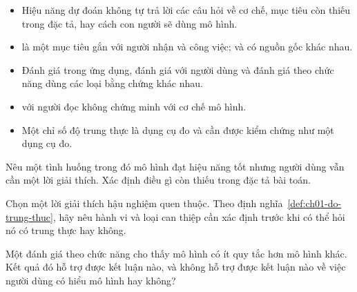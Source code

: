 \begin{tomtat}
\begin{itemize}
  \item Hiệu năng dự đoán không tự trả lời các câu hỏi về cơ chế, mục tiêu còn
  thiếu trong đặc tả, hay cách con người sẽ dùng mô hình.
  \item {} là một mục tiêu gắn với
  người nhận và công việc;  và  có nguồn gốc khác nhau.
  \item Đánh giá trong ứng dụng, đánh giá với người dùng và đánh giá theo chức
  năng dùng các loại bằng chứng khác nhau.
  \item {} với người đọc không chứng minh
   với cơ chế mô hình.
  \item Một chỉ số độ trung thực là dụng cụ đo và cần được kiểm chứng như một
  dụng cụ đo.
\end{itemize}
\end{tomtat}

\cauhoi
\begin{cauhoids}
  \item Nêu một tình huống trong đó mô hình đạt hiệu năng tốt nhưng người dùng
  vẫn cần một lời giải thích. Xác định điều gì còn thiếu trong đặc tả bài toán.
  \item Chọn một lời giải thích hậu nghiệm quen thuộc. Theo
  định nghĩa~\ref{def:ch01-do-trung-thuc}, hãy nêu hành vi và loại can thiệp
  cần xác định trước khi có thể hỏi nó có trung thực hay không.
  \item Một đánh giá theo chức năng cho thấy mô hình có ít quy tắc hơn mô hình
  khác. Kết quả đó hỗ trợ được kết luận nào, và không hỗ trợ được kết luận nào
  về việc người dùng có hiểu mô hình hay không?
\end{cauhoids}
